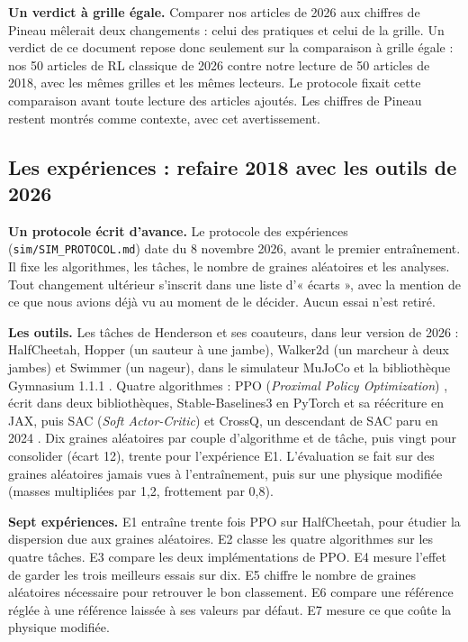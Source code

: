 \documentclass[11pt,a4paper]{article}
\begin{document}
\textbf{Un verdict à grille égale.} Comparer nos articles de 2026 aux
chiffres de Pineau mêlerait deux changements : celui des pratiques et
celui de la grille. Un verdict de ce document repose donc seulement sur
la comparaison à grille égale : nos 50 articles de RL classique de 2026
contre notre lecture de 50 articles de 2018, avec les mêmes grilles et
les mêmes lecteurs. Le protocole fixait cette comparaison avant toute
lecture des articles ajoutés. Les chiffres de Pineau restent montrés
comme contexte, avec cet avertissement.

\subsection{Les expériences : refaire 2018 avec les outils de
2026}\label{les-expuxe9riences-refaire-2018-avec-les-outils-de-2026}

\textbf{Un protocole écrit d'avance.} Le protocole des expériences
(\texttt{sim/SIM\_PROTOCOL.md}) date du 8 novembre 2026, avant le
premier entraînement. Il fixe les algorithmes, les tâches, le nombre de
graines aléatoires et les analyses. Tout changement ultérieur s'inscrit
dans une liste d'« écarts », avec la mention de ce que nous avions déjà
vu au moment de le décider. Aucun essai n'est retiré.

\textbf{Les outils.} Les tâches de Henderson et ses coauteurs, dans leur
version de 2026 : HalfCheetah, Hopper (un sauteur à une jambe), Walker2d
(un marcheur à deux jambes) et Swimmer (un nageur), dans le simulateur
MuJoCo et la bibliothèque Gymnasium 1.1.1
\autocite{towers2024gymnasium}. Quatre algorithmes : PPO (\emph{Proximal
Policy Optimization}) \autocite{schulman2017ppo}, écrit dans deux
bibliothèques, Stable-Baselines3 en PyTorch \autocite{raffin2021sb3} et
sa réécriture en JAX, puis SAC (\emph{Soft Actor-Critic})
\autocite{haarnoja2018sac} et CrossQ, un descendant de SAC paru en 2024
\autocite{bhatt2024crossq}. Dix graines aléatoires par couple
d'algorithme et de tâche, puis vingt pour consolider (écart 12), trente
pour l'expérience E1. L'évaluation se fait sur des graines aléatoires
jamais vues à l'entraînement, puis sur une physique modifiée (masses
multipliées par 1,2, frottement par 0,8).

\textbf{Sept expériences.} E1 entraîne trente fois PPO sur HalfCheetah,
pour étudier la dispersion due aux graines aléatoires. E2 classe les
quatre algorithmes sur les quatre tâches. E3 compare les deux
implémentations de PPO. E4 mesure l'effet de garder les trois meilleurs
essais sur dix. E5 chiffre le nombre de graines aléatoires nécessaire
pour retrouver le bon classement. E6 compare une référence réglée à une
référence laissée à ses valeurs par défaut. E7 mesure ce que coûte la
physique modifiée.
\end{document}
